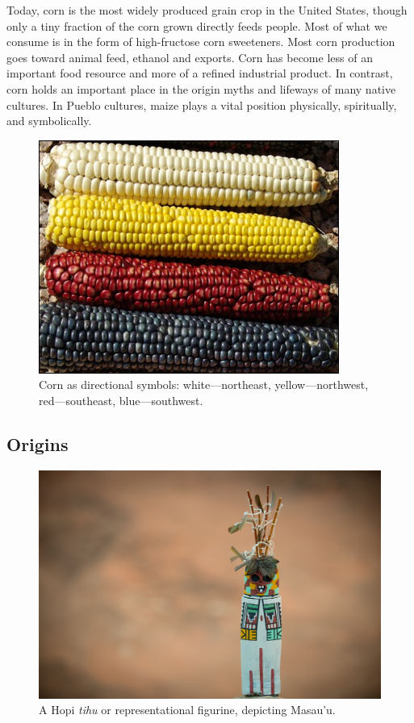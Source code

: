 \documentclass[12pt,]{article}
\begin{document}
Today, corn is the most widely produced grain crop in the United States, though only a tiny fraction of the corn grown directly feeds people. Most of what we consume is in the form of high-fructose corn sweeteners. Most corn production goes toward animal feed, ethanol and exports. Corn has become less of an important food resource and more of a refined industrial product. In contrast, corn holds an important place in the origin myths and lifeways of many native cultures. In Pueblo cultures, maize plays a vital position physically, spiritually, and symbolically.

\begin{figure}
\centering
\includegraphics{./images/directional_corn.jpg}
\caption{Corn as directional symbols: white---northeast, yellow---northwest, red---southeast, blue---southwest.}
\end{figure}

\hypertarget{origins}{%
\subsection{Origins}\label{origins}}

\begin{figure}
\centering
\includegraphics{./images/section_2.1_origin.jpg}
\caption{A Hopi \emph{tihu} or representational figurine, depicting Masau'u.}
\end{figure}
\end{document}
